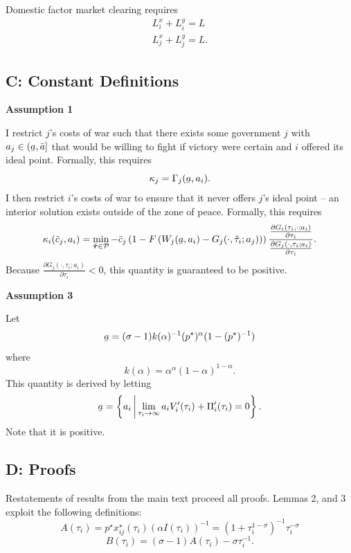 \documentclass{puthesis}
\DeclareRobustCommand{\ubar}[1]{\underaccent{\bar}{#1}}
\begin{document}
Domestic factor market clearing requires \begin{equation*}
\begin{split}
L_i^x + L_i^y = L \\
L_j^x + L_j^y = L .
\end{split}
\end{equation*}

\subsection{C: Constant Definitions}

\textbf{Assumption 1}

I restrict \(j\)'s costs of war such that there exists some government
\(j\) with \(a_j \in (\ubar{a}, \bar{a}]\) that would be willing to
fight if victory were certain and \(i\) offered its ideal point.
Formally, this requires \[
\kappa_j = \Gamma_j(\ubar{a}, a_i) .
\] I then restrict \(i\)'s costs of war to ensure that it never offers
\(j\)'s ideal point -- an interior solution exists outside of the zone
of peace. Formally, this requires \[
\kappa_i(\bar{c}_j, a_i) = \min_{\tilde{\bm{\tau}} \in \mathcal{P}} - \bar{c}_j \left( 1 - F \left( W_j(\ubar{a}, a_i) - G_j(\cdot, \tilde{\tau}_i; a_j) \right) \right) \frac{ \frac{\partial G_i(\tau_i, \cdot; a_i)}{\partial \tau_i} }{ \frac{\partial G_j(\cdot, \tau_i; a_i)}{\partial \tau_i} } .
\] Because
\(\frac{\partial G_j(\cdot, \tau_i; a_i)}{\partial \tau_i} < 0\), this
quantity is guaranteed to be positive.

\textbf{Assumption 3}

Let \[
\ubar{a} = (\sigma - 1) k(\alpha)^{-1} (p^\star)^{\alpha} (1 - (p^\star)^{-1})
\] where \[
k(\alpha) = \alpha^\alpha (1 - \alpha)^{1 - \alpha} .
\] This quantity is derived by letting \[
\ubar{a} = \left\{ a_i \,\middle|\, \lim_{\tau_i \rightarrow \infty} a_i V_i^\prime(\tau_i) + \Pi_i^\prime(\tau_i) = 0 \right\} .
\] Note that it is positive.

\subsection{D: Proofs}

Restatements of results from the main text proceed all proofs. Lemmas 2,
and 3 exploit the following definitions: \[
A(\tau_i) = p^\star x_{ij}^\star(\tau_i) (\alpha I(\tau_i))^{-1} = \left( 1 + \tau_i^{1-\sigma} \right)^{-1} \tau_i^{-\sigma}
\] \[
B(\tau_i) = (\sigma - 1) A(\tau_i) - \sigma \tau_i^{-1} .
\]
\end{document}

